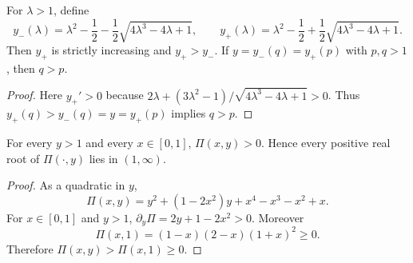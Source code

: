 \begin{lemma}\label{lem:ygt1-sheet-comparison}
For $\lambda>1$, define
\[
y_-(\lambda)=\lambda^2-\frac12-\frac12\sqrt{4\lambda^3-4\lambda+1},
\qquad
y_+(\lambda)=\lambda^2-\frac12+\frac12\sqrt{4\lambda^3-4\lambda+1}.
\]
Then $y_+$ is strictly increasing and $y_+>y_-$.  If $y=y_-(q)=y_+(p)$ with $p,q>1$, then $q>p$.
\end{lemma}
\begin{proof}
Here $y_+'>0$ because $2\lambda+(3\lambda^2-1)/\sqrt{4\lambda^3-4\lambda+1}>0$.  Thus $y_+(q)>y_-(q)=y=y_+(p)$ implies $q>p$.
\end{proof}

\begin{lemma}\label{lem:ygt1-no-small-positive-roots}
For every $y>1$ and every $x\in[0,1]$, $\Pi(x,y)>0$.  Hence every positive real root of $\Pi(\cdot,y)$ lies in $(1,\infty)$.
\end{lemma}
\begin{proof}
As a quadratic in $y$,
\[
\Pi(x,y)=y^2+(1-2x^2)y+x^4-x^3-x^2+x.
\]
For $x\in[0,1]$ and $y>1$, $\partial_y\Pi=2y+1-2x^2>0$.  Moreover
\[
\Pi(x,1)=(1-x)(2-x)(1+x)^2\ge0.
\]
Therefore $\Pi(x,y)>\Pi(x,1)\ge0$.
\end{proof}

